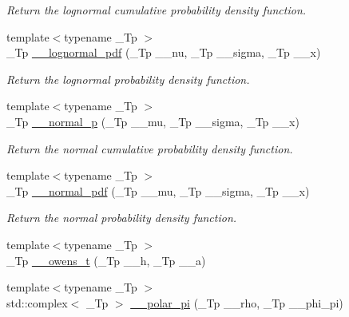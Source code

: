 \begin{DoxyCompactItemize}
\begin{DoxyCompactList}\small\item\em Return the lognormal cumulative probability density function. \end{DoxyCompactList}\item 
{\footnotesize template$<$typename \+\_\+\+Tp $>$ }\\\+\_\+\+Tp \hyperlink{namespacestd_1_1____detail_a46c5dea7a38f38965bce5a84d389a02b}{\+\_\+\+\_\+lognormal\+\_\+pdf} (\+\_\+\+Tp \+\_\+\+\_\+nu, \+\_\+\+Tp \+\_\+\+\_\+sigma, \+\_\+\+Tp \+\_\+\+\_\+x)
\begin{DoxyCompactList}\small\item\em Return the lognormal probability density function. \end{DoxyCompactList}\item 
{\footnotesize template$<$typename \+\_\+\+Tp $>$ }\\\+\_\+\+Tp \hyperlink{namespacestd_1_1____detail_a4a088c2e6ddea7db99af9d114bf31b46}{\+\_\+\+\_\+normal\+\_\+p} (\+\_\+\+Tp \+\_\+\+\_\+mu, \+\_\+\+Tp \+\_\+\+\_\+sigma, \+\_\+\+Tp \+\_\+\+\_\+x)
\begin{DoxyCompactList}\small\item\em Return the normal cumulative probability density function. \end{DoxyCompactList}\item 
{\footnotesize template$<$typename \+\_\+\+Tp $>$ }\\\+\_\+\+Tp \hyperlink{namespacestd_1_1____detail_a6211a0741c8e2dfb219fb52d072295f4}{\+\_\+\+\_\+normal\+\_\+pdf} (\+\_\+\+Tp \+\_\+\+\_\+mu, \+\_\+\+Tp \+\_\+\+\_\+sigma, \+\_\+\+Tp \+\_\+\+\_\+x)
\begin{DoxyCompactList}\small\item\em Return the normal probability density function. \end{DoxyCompactList}\item 
{\footnotesize template$<$typename \+\_\+\+Tp $>$ }\\\+\_\+\+Tp \hyperlink{namespacestd_1_1____detail_a5b50a9d8beaca5a637c8293ab01bf124}{\+\_\+\+\_\+owens\+\_\+t} (\+\_\+\+Tp \+\_\+\+\_\+h, \+\_\+\+Tp \+\_\+\+\_\+a)
\item 
{\footnotesize template$<$typename \+\_\+\+Tp $>$ }\\std\+::complex$<$ \+\_\+\+Tp $>$ \hyperlink{namespacestd_1_1____detail_ac69e259ad511fcc7a54c6ec315adcfa4}{\+\_\+\+\_\+polar\+\_\+pi} (\+\_\+\+Tp \+\_\+\+\_\+rho, \+\_\+\+Tp \+\_\+\+\_\+phi\+\_\+pi)
\item 

\end{DoxyCompactItemize}
